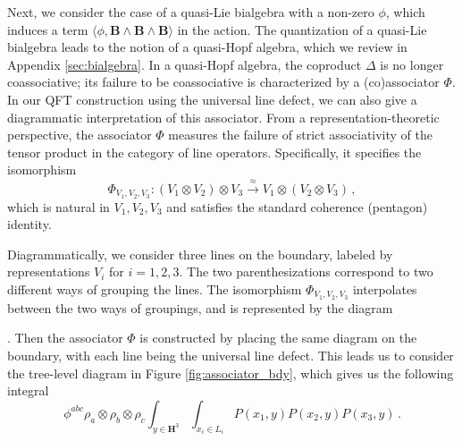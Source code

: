 \documentclass[11pt]{article}
\numberwithin{equation}{section}
\begin{document}
Next, we consider the case of a quasi-Lie bialgebra with a non-zero $\phi$, which induces a term $\langle\phi,\boldsymbol{B}\wedge \boldsymbol{B}\wedge \boldsymbol{B}\rangle$ in the action. The quantization of a quasi-Lie bialgebra leads to the notion of a quasi-Hopf algebra, which we review in Appendix \ref{sec:bialgebra}. In a quasi-Hopf algebra, the coproduct $\Delta$ is no longer coassociative; its failure to be coassociative is characterized by a (co)associator $\Phi$. In our QFT construction using the universal line defect, we can also give a diagrammatic interpretation of this associator. From a representation-theoretic perspective, the associator $\Phi$ measures the failure of strict associativity of the tensor product in the category of line operators. Specifically, it specifies the isomorphism 
\begin{equation}
	\Phi_{V_1,V_2,V_3}: (V_1 \otimes V_2) \otimes V_3 \xrightarrow{\approx} V_1 \otimes (V_2 \otimes V_3)\,,
\end{equation}
which is natural in $V_1, V_2, V_3$ and satisfies the standard coherence (pentagon) identity.

Diagrammatically, we consider three lines on the boundary, labeled by representations $V_i$ for $i=1,2,3$. The two parenthesizations correspond to two different ways of grouping the lines. The isomorphism $\Phi_{V_1,V_2,V_3}$ interpolates between the two ways of groupings, and is represented by the diagram 
.
Then the associator $\Phi$ is constructed by placing the same diagram on the boundary, with each line being the universal line defect. This leads us to consider the tree-level diagram in Figure \ref{fig:associator_bdy}, which gives us the following integral
\begin{equation}
 \phi^{abc} \rho_a\otimes\rho_b\otimes\rho_c  \int_{y \in \mathbf{H}^3} \int_{x_i \in L_i} P(x_1,y) P(x_2,y) P(x_3,y)\,.
\end{equation}
\end{document}
